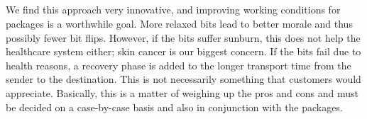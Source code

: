 \documentclass{article}
\begin{document}
    \subsection{}

        We find this approach very innovative, and improving working conditions for packages is a worthwhile goal. More relaxed bits lead to better morale and thus possibly fewer bit flips. However, if the bits suffer sunburn, this does not help the healthcare system either; skin cancer is our biggest concern. If the bits fail due to health reasons, a recovery phase is added to the longer transport time from the sender to the destination. This is not necessarily something that customers would appreciate. Basically, this is a matter of weighing up the pros and cons and must be decided on a case-by-case basis and also in conjunction with the packages.
    
    
\end{document}

